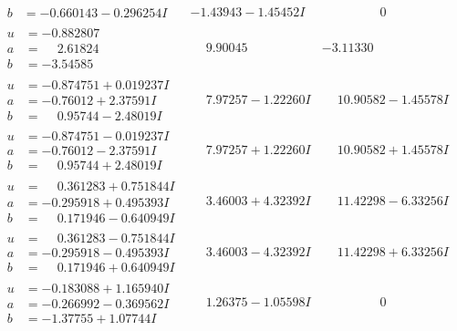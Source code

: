 \documentclass[1p]{elsarticle_modified}
\theoremstyle{definition}
\begin{document}
$$\begin{array}{c|c|c}
\begin{aligned}
b &= -0.660143 - 0.296254 I\end{aligned}
 & -1.43943 - 1.45452 I & \phantom{-0.000000 } 0 \\ \hline\begin{aligned}
u &= -0.882807\phantom{ +0.000000I} \\
a &= \phantom{-}2.61824\phantom{ +0.000000I} \\
b &= -3.54585\phantom{ +0.000000I}\end{aligned}
 & \phantom{-}9.90045\phantom{ +0.000000I} & -3.11330\phantom{ +0.000000I} \\ \hline\begin{aligned}
u &= -0.874751 + 0.019237 I \\
a &= -0.76012 + 2.37591 I \\
b &= \phantom{-}0.95744 - 2.48019 I\end{aligned}
 & \phantom{-}7.97257 - 1.22260 I & \phantom{-}10.90582 - 1.45578 I \\ \hline\begin{aligned}
u &= -0.874751 - 0.019237 I \\
a &= -0.76012 - 2.37591 I \\
b &= \phantom{-}0.95744 + 2.48019 I\end{aligned}
 & \phantom{-}7.97257 + 1.22260 I & \phantom{-}10.90582 + 1.45578 I \\ \hline\begin{aligned}
u &= \phantom{-}0.361283 + 0.751844 I \\
a &= -0.295918 + 0.495393 I \\
b &= \phantom{-}0.171946 - 0.640949 I\end{aligned}
 & \phantom{-}3.46003 + 4.32392 I & \phantom{-}11.42298 - 6.33256 I \\ \hline\begin{aligned}
u &= \phantom{-}0.361283 - 0.751844 I \\
a &= -0.295918 - 0.495393 I \\
b &= \phantom{-}0.171946 + 0.640949 I\end{aligned}
 & \phantom{-}3.46003 - 4.32392 I & \phantom{-}11.42298 + 6.33256 I \\ \hline\begin{aligned}
u &= -0.183088 + 1.165940 I \\
a &= -0.266992 - 0.369562 I \\
b &= -1.37755 + 1.07744 I\end{aligned}
 & \phantom{-}1.26375 - 1.05598 I & \phantom{-0.000000 } 0 \\ \hline\begin{aligned}

\end{aligned}
\end{array}$$
\end{document}
